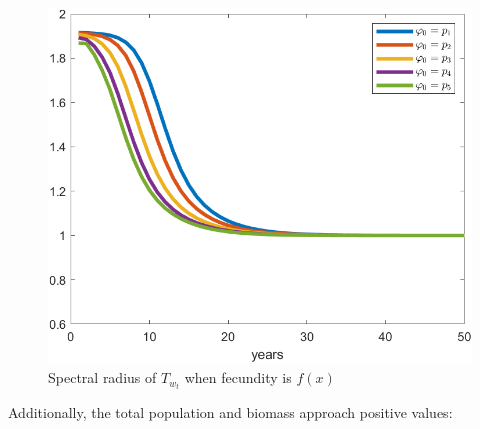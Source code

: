 \begin{figure}[H]
	\centering
	\includegraphics[width=0.7\linewidth]{Images/F=1/spectral_radius_when_f=1}
	\caption{Spectral radius of $T_{w_t}$ when fecundity is $f(x)$}
	\label{fig:spectralradiuswhenf=1}
\end{figure}

Additionally, the total population and biomass approach positive values:

